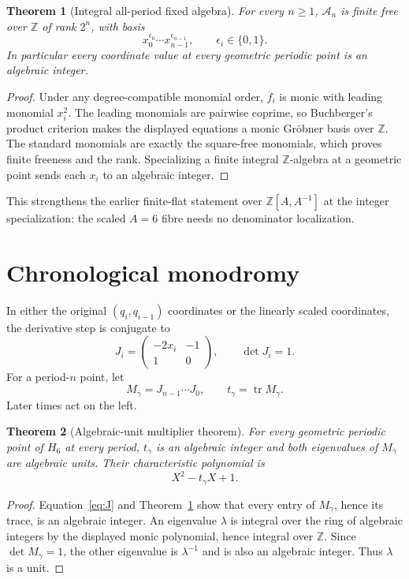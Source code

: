 \documentclass[11pt]{article}
\newtheorem{theorem}{Theorem}[section]
\theoremstyle{remark}\newtheorem{remark}[theorem]{Remark}
\begin{document}
\begin{theorem}[Integral all-period fixed algebra]\label{thm:free}
For every $n\ge1$, $\mathcal A_n$ is finite free over $\mathbb Z$ of rank
$2^n$, with basis
\[
x_0^{\epsilon_0}\cdots x_{n-1}^{\epsilon_{n-1}},
\qquad \epsilon_i\in\{0,1\}.
\]
In particular every coordinate value at every geometric periodic point is an
algebraic integer.
\end{theorem}
\begin{proof}
Under any degree-compatible monomial order, $f_i$ is monic with leading
monomial $x_i^2$.  The leading monomials are pairwise coprime, so Buchberger's
product criterion makes the displayed equations a monic Gr\"obner basis over
$\mathbb Z$.  The standard monomials are exactly the square-free monomials,
which proves finite freeness and the rank.  Specializing a finite integral
$\mathbb Z$-algebra at a geometric point sends each $x_i$ to an algebraic
integer.
\end{proof}

This strengthens the earlier finite-flat statement over
$\mathbb Z[A,A^{-1}]$ at the integer specialization: the scaled $A=6$ fibre
needs no denominator localization.

\section{Chronological monodromy}
In either the original $(q_i,q_{i-1})$ coordinates or the linearly scaled
coordinates, the derivative step is conjugate to
\begin{equation}\label{eq:J}
J_i=\begin{pmatrix}-2x_i&-1\\1&0\end{pmatrix},
\qquad \det J_i=1.
\end{equation}
For a period-$n$ point, let
\[
M_\gamma=J_{n-1}\cdots J_0,
\qquad t_\gamma=\operatorname{tr}M_\gamma.
\]
Later times act on the left.

\begin{theorem}[Algebraic-unit multiplier theorem]\label{thm:unit}
For every geometric periodic point of $H_6$ at every period,
$t_\gamma$ is an algebraic integer and both eigenvalues of $M_\gamma$ are
algebraic units.  Their characteristic polynomial is
\[
X^2-t_\gamma X+1.
\]
\end{theorem}
\begin{proof}
Equation~\eqref{eq:J} and Theorem~\ref{thm:free} show that every entry of
$M_\gamma$, hence its trace, is an algebraic integer.  An eigenvalue
$\lambda$ is integral over the ring of algebraic integers by the displayed
monic polynomial, hence integral over $\mathbb Z$.  Since
$\det M_\gamma=1$, the other eigenvalue is $\lambda^{-1}$ and is also an
algebraic integer.  Thus $\lambda$ is a unit.
\end{proof}
\end{document}
